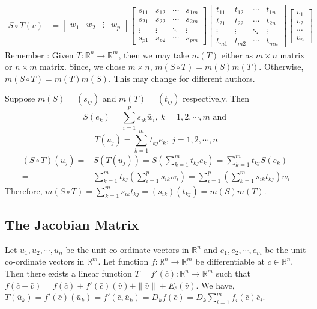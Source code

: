 \begin{commentary}
\begin{align*}
	S \circ T(\bar{v}) & = \begin{bmatrix} \bar{w}_1 & \bar{w}_2 & \vdots & \bar{w}_p \end{bmatrix} \begin{bmatrix} s_{11} & s_{12} & \cdots & s_{1m} \\ s_{21} & s_{22} & \cdots & s_{2m} \\ \vdots & \vdots & \ddots & \vdots \\ s_{p1} & s_{p2} & \cdots & s_{pm} \end{bmatrix} \begin{bmatrix} t_{11} & t_{12} & \cdots & t_{1n} \\ t_{21} & t_{22} & \cdots & t_{2n} \\ \vdots & \vdots & \ddots & \vdots \\ t_{m1} & t_{m2} & \cdots & t_{mn} \end{bmatrix} \begin{bmatrix} v_1 \\ v_2 \\ \cdots \\ v_n  \end{bmatrix} 
\end{align*}
Remember : Given $T : \mathbb{R}^n \to \mathbb{R}^m$, then we may take $m(T)$ either as $m \times n$ matrix or $n \times m$ matrix.
Since, we chose $m \times n$, $m(S \circ T) = m(S)m(T)$.
Otherwise, $m(S \circ T) = m(T)m(S)$.
This may change for different authors.
\end{commentary}

Suppose $m(S) = (s_{ij})$ and $m(T) = (t_{ij})$ respectively.
Then
\[ S(e_k) = \sum_{i=1}^p s_{ik} \bar{w}_i,\ k=1,2,\cdots,m \text{ and }\]
\[ T(u_j) = \sum_{k=1}^m t_{kj} \bar{e}_k,\ j=1,2,\cdots,n \]
\begin{align*}
	(S \circ T)(\bar{u}_j) = & S(T(\bar{u}_j)) = S\left(\sum_{k=1}^m t_{kj}\bar{e}_k\right) = \sum_{k=1}^m t_{kj}S(\bar{e}_k) \\ 
	= & \sum_{k=1}^m t_{kj}\left( \sum_{i=1}^p s_{ik} \bar{w}_i\right) = \sum_{i=1}^p \left(\sum_{k=1}^m s_{ik}t_{kj}\right)\bar{w}_i
\end{align*}
Therefore, $m(S \circ T) = \sum_{k=1}^m s_{ik}t_{kj} = (s_{ik})(t_{kj}) =  m(S)m(T)$.

\subsection{The Jacobian Matrix}
Let $\bar{u}_1, \bar{u}_2, \cdots, \bar{u}_n$ be the unit co-ordinate vectors in $\mathbb{R}^n$ and $\bar{e}_1, \bar{e}_2, \cdots, \bar{e}_m$ be the unit co-ordinate vectors in $\mathbb{R}^m$.
Let function $f : \mathbb{R}^n \to \mathbb{R}^m$ be differentiable at $\bar{c} \in \mathbb{R}^n$.
Then there exists a linear function $T = f'(\bar{c}) : \mathbb{R}^n \to \mathbb{R}^m$ such that $f(\bar{c}+\bar{v}) = f(\bar{c})+f'(\bar{c})(\bar{v}) + \|\bar{v}\|+E_{\bar{c}}(\bar{v})$.
We have, $T(\bar{u}_k) = f'(\bar{c})(\bar{u}_k) = f'(\bar{c},\bar{u}_k) = D_kf(\bar{c}) = D_k \sum_{i=1}^m f_i(\bar{c})\bar{e}_i$.

